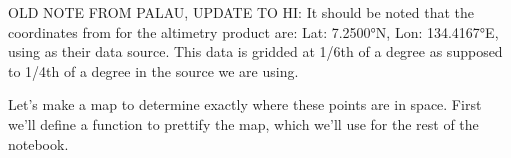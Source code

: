 \documentclass[letterpaper,10pt,english]{jupyterBook}
\begin{document}
\begin{sphinxShadowBox}
\sphinxstylesidebartitle{}

\sphinxAtStartPar
OLD NOTE FROM PALAU, UPDATE TO HI:
It should be noted that the coordinates from  for the altimetry product are: Lat: 7.2500°N, Lon: 134.4167°E, using  as their data source. This data is gridded at 1/6th of a degree as supposed to 1/4th of a degree in the source we are using.
\end{sphinxShadowBox}

\sphinxAtStartPar
Let’s make a map to determine exactly where these points are in space. First we’ll define a function to prettify the map, which we’ll use for the rest of the notebook.
\end{document}
